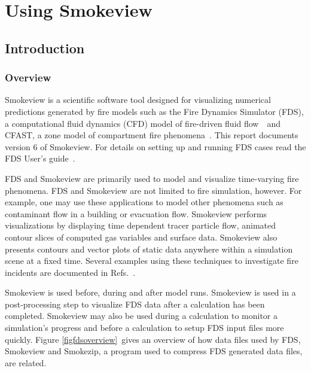 \documentclass[11pt,twoside]{book}
\begin{document}
\cleardoublepage
\tableofcontents

\cleardoublepage
\listoffigures

\cleardoublepage
\listoftables

\mainmatter



\part{Using Smokeview}
\chapter{Introduction}
\section{Overview}
Smokeview is a scientific software tool designed for visualizing
numerical predictions generated by fire models such as the Fire
Dynamics Simulator (FDS), a computational fluid dynamics (CFD)
model of fire-driven fluid flow~\cite{FDS_Tech_Guide}\ and CFAST, a
zone model of compartment fire phenomena~\cite{CFAST_Tech_Guide_7}. This
report documents version 6 of Smokeview. For details on setting up
and running FDS cases read the FDS User's
guide~\cite{FDS_Users_Guide}.

FDS and Smokeview are primarily used to model and visualize
time-varying fire phenomena. FDS and Smokeview are not limited to
fire simulation, however. For example, one may use these
applications to model other phenomena such as contaminant flow in
a building or evacuation flow. Smokeview performs visualizations
by displaying time dependent tracer particle flow, animated
contour slices of computed gas variables and surface data.
Smokeview also presents contours and vector plots of static data
anywhere within a simulation scene at a fixed time. Several
examples using these techniques to investigate fire incidents are
documented in Refs.~\cite{CHERRYROAD,Iowa,HOUSTON,WTC}.

Smokeview is used before, during and after model runs. Smokeview
is used in a post-processing step to visualize FDS data after a
calculation has been completed. Smokeview  may also be used during
a calculation to monitor a simulation's progress and before a
calculation to setup FDS input files more quickly.  Figure
\ref{figfdsoverview}\ gives an overview of how data files used by
FDS,  Smokeview and Smokezip, a program used to compress FDS
generated data files, are related.
\end{document}
